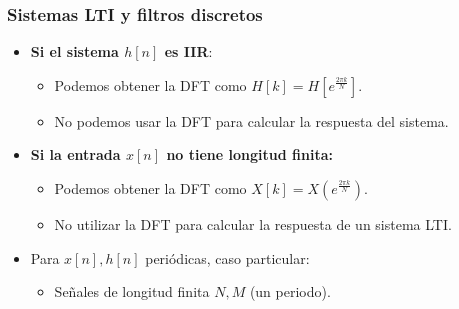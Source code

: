 \documentclass{beamer}
\numberwithin{section}{part}
\begin{document}
\begin{frame}
  \frametitle{Sistemas LTI y filtros discretos}
  
  \begin{itemize}
    \item \textbf{Si el sistema $h[n]$ es IIR}:
    \begin{itemize}
      \item Podemos obtener la DFT como $H[k]=H[e^{\frac{2\pi k}{N}}]$. 
      \item No podemos usar la DFT para calcular la respuesta del sistema.
    \end{itemize}
    \vspace{0.2cm}
  
    \item \textbf{Si la entrada $x[n]$ no tiene longitud finita:}
    \begin{itemize}
      \item Podemos obtener la DFT como $X[k]=X(e^{\frac{2\pi k}{N}})$.
      \item No utilizar la DFT para calcular la respuesta de un sistema LTI.
    \end{itemize}
    \vspace{0.2cm}

    \item Para $x[n],h[n]$ periódicas, caso particular:
    \begin{itemize}
      \item Señales de longitud finita $N,M$ (un periodo). 
    \end{itemize}
  \end{itemize}
\end{frame}
  
\end{document}
